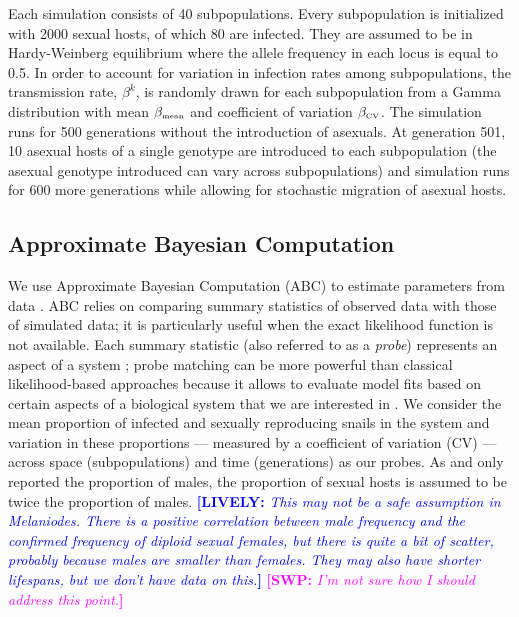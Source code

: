 \documentclass{article}\usepackage[]{graphicx}\usepackage[]{color}
\newcommand{\comment}[3]{\textcolor{#1}{\textbf{[#2: }\textit{#3}\textbf{]}}}
\newcommand{\swp}[1]{\comment{magenta}{SWP}{#1}}
\newcommand{\lively}[1]{\comment{blue}{LIVELY}{#1}}
\begin{document}
Each simulation consists of 40 subpopulations. 
Every subpopulation is initialized with 2000 sexual hosts, of which 80 are infected. 
They are assumed to be in Hardy-Weinberg equilibrium where the allele frequency in each locus is equal to 0.5. 
In order to account for variation in infection rates among subpopulations, the transmission rate, $\beta^k$, is randomly drawn for each subpopulation from a Gamma distribution with mean $\beta_{\textrm{\tiny mean}}$ and coefficient of variation $\beta_{\textrm{\tiny CV}}$. 
The simulation runs for 500 generations without the introduction of asexuals. At generation 501, 10 asexual hosts of a single genotype are introduced to each subpopulation (the asexual genotype introduced can vary across subpopulations) and simulation runs for 600 more generations while allowing for stochastic migration of asexual hosts.

\subsection{Approximate Bayesian Computation}

We use Approximate Bayesian Computation (ABC) to estimate parameters from data \citep{toni2009approximate}.
ABC relies on comparing summary statistics of observed data with those of simulated data; it is particularly useful when the exact likelihood function is not available.
Each summary statistic (also referred to as a \emph{probe}) represents an aspect of a system ;
probe matching can be more powerful than classical likelihood-based approaches because it allows to evaluate model fits based on certain aspects of a biological system that we are interested in \citep{wood2010statistical}.
We consider the mean proportion of infected and sexually reproducing snails in the system and variation in these proportions --- measured by a coefficient of variation (CV) --- across space (subpopulations) and time (generations) as our probes.
As \cite{dagan2013clonal} and \cite{mckone2016fine} only reported the proportion of males, the proportion of sexual hosts is assumed to be twice the proportion of males.
\lively{This may not be a safe assumption in Melaniodes.  
There is a positive correlation between male frequency and the confirmed frequency of diploid sexual females, but there is quite a bit of scatter, probably because males are smaller than females.  They may also have shorter lifespans, but we don't have data on this.}
\swp{I'm not sure how I should address this point.}
\end{document}

